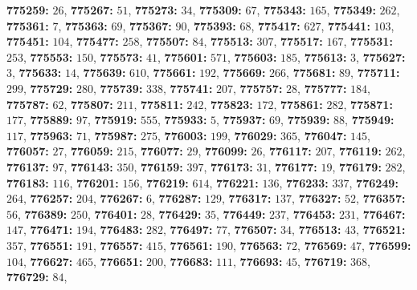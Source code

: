 \textsf{\bfseries 775259:} $26$, \textsf{\bfseries 775267:} $51$, \textsf{\bfseries 775273:} $34$, \textsf{\bfseries 775309:} $67$, \textsf{\bfseries 775343:} $165$, \textsf{\bfseries 775349:} $262$, \textsf{\bfseries 775361:} $7$, \textsf{\bfseries 775363:} $69$, \textsf{\bfseries 775367:} $90$, \textsf{\bfseries 775393:} $68$, \textsf{\bfseries 775417:} $627$, \textsf{\bfseries 775441:} $103$, \textsf{\bfseries 775451:} $104$, \textsf{\bfseries 775477:} $258$, \textsf{\bfseries 775507:} $84$, \textsf{\bfseries 775513:} $307$, \textsf{\bfseries 775517:} $167$, \textsf{\bfseries 775531:} $253$, \textsf{\bfseries 775553:} $150$, \textsf{\bfseries 775573:} $41$, \textsf{\bfseries 775601:} $571$, \textsf{\bfseries 775603:} $185$, \textsf{\bfseries 775613:} $3$, \textsf{\bfseries 775627:} $3$, \textsf{\bfseries 775633:} $14$, \textsf{\bfseries 775639:} $610$, \textsf{\bfseries 775661:} $192$, \textsf{\bfseries 775669:} $266$, \textsf{\bfseries 775681:} $89$, \textsf{\bfseries 775711:} $299$, \textsf{\bfseries 775729:} $280$, \textsf{\bfseries 775739:} $338$, \textsf{\bfseries 775741:} $207$, \textsf{\bfseries 775757:} $28$, \textsf{\bfseries 775777:} $184$, \textsf{\bfseries 775787:} $62$, \textsf{\bfseries 775807:} $211$, \textsf{\bfseries 775811:} $242$, \textsf{\bfseries 775823:} $172$, \textsf{\bfseries 775861:} $282$, \textsf{\bfseries 775871:} $177$, \textsf{\bfseries 775889:} $97$, \textsf{\bfseries 775919:} $555$, \textsf{\bfseries 775933:} $5$, \textsf{\bfseries 775937:} $69$, \textsf{\bfseries 775939:} $88$, \textsf{\bfseries 775949:} $117$, \textsf{\bfseries 775963:} $71$, \textsf{\bfseries 775987:} $275$, \textsf{\bfseries 776003:} $199$, \textsf{\bfseries 776029:} $365$, \textsf{\bfseries 776047:} $145$, \textsf{\bfseries 776057:} $27$, \textsf{\bfseries 776059:} $215$, \textsf{\bfseries 776077:} $29$, \textsf{\bfseries 776099:} $26$, \textsf{\bfseries 776117:} $207$, \textsf{\bfseries 776119:} $262$, \textsf{\bfseries 776137:} $97$, \textsf{\bfseries 776143:} $350$, \textsf{\bfseries 776159:} $397$, \textsf{\bfseries 776173:} $31$, \textsf{\bfseries 776177:} $19$, \textsf{\bfseries 776179:} $282$, \textsf{\bfseries 776183:} $116$, \textsf{\bfseries 776201:} $156$, \textsf{\bfseries 776219:} $614$, \textsf{\bfseries 776221:} $136$, \textsf{\bfseries 776233:} $337$, \textsf{\bfseries 776249:} $264$, \textsf{\bfseries 776257:} $204$, \textsf{\bfseries 776267:} $6$, \textsf{\bfseries 776287:} $129$, \textsf{\bfseries 776317:} $137$, \textsf{\bfseries 776327:} $52$, \textsf{\bfseries 776357:} $56$, \textsf{\bfseries 776389:} $250$, \textsf{\bfseries 776401:} $28$, \textsf{\bfseries 776429:} $35$, \textsf{\bfseries 776449:} $237$, \textsf{\bfseries 776453:} $231$, \textsf{\bfseries 776467:} $147$, \textsf{\bfseries 776471:} $194$, \textsf{\bfseries 776483:} $282$, \textsf{\bfseries 776497:} $77$, \textsf{\bfseries 776507:} $34$, \textsf{\bfseries 776513:} $43$, \textsf{\bfseries 776521:} $357$, \textsf{\bfseries 776551:} $191$, \textsf{\bfseries 776557:} $415$, \textsf{\bfseries 776561:} $190$, \textsf{\bfseries 776563:} $72$, \textsf{\bfseries 776569:} $47$, \textsf{\bfseries 776599:} $104$, \textsf{\bfseries 776627:} $465$, \textsf{\bfseries 776651:} $200$, \textsf{\bfseries 776683:} $111$, \textsf{\bfseries 776693:} $45$, \textsf{\bfseries 776719:} $368$, \textsf{\bfseries 776729:} $84$, 
